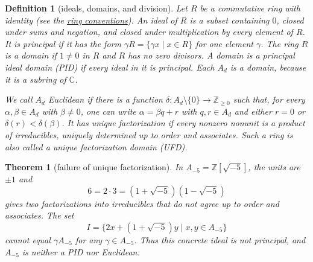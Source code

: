 \documentclass[11pt]{article}
\theoremstyle{ntstyle}
\newtheorem{theorem}{Theorem}[subsection]
\newtheorem{definition}{Definition}[subsection]
\begin{document}
\begin{definition}[ideals, domains, and division]\label{def:8.7.2}\label{def:ideals-domains-and-division}
  Let $R$ be a commutative ring with identity
  (see the \hyperref[def:rings]{ring conventions}). An ideal of $R$ is a subset containing
  $0$, closed under sums and negation, and closed under multiplication
  by every element of $R$. It is principal if it has the form
  $\gamma R=\{\gamma x\mid x\in R\}$ for one element $\gamma$.
  The ring $R$ is a domain if $1\neq0$ in $R$ and $R$ has no zero
  divisors. A domain is a principal ideal domain (PID) if every ideal
  in it is principal. Each $A_d$ is a domain, because it is a subring
  of $\mathbb{C}$.

  We call $A_d$ Euclidean if there is a function
  $\delta:A_d\setminus\{0\}\to\mathbb{Z}_{\ge0}$ such that, for
  every $\alpha,\beta\in A_d$ with $\beta\neq0$, one can write
  $\alpha=\beta q+r$ with $q,r\in A_d$ and either $r=0$ or
  $\delta(r)<\delta(\beta)$.
  It has unique factorization if every nonzero nonunit is a product
  of irreducibles, uniquely determined up to order and associates. Such a ring
  is also called a unique factorization domain (UFD).

\end{definition}

\begin{theorem}[failure of unique factorization]\label{thm:8.7.2}\label{thm:failure-of-unique-factorization}
  In $A_{-5}=\mathbb{Z}[\sqrt{-5}]$, the units are $\pm1$ and
  \[
    6=2\cdot3=(1+\sqrt{-5})(1-\sqrt{-5})
  \]
  gives two factorizations into irreducibles that do not agree up to
  order and associates. The set
  \[
    I=\{2x+(1+\sqrt{-5})y\mid x,y\in A_{-5}\}
  \]
  cannot equal $\gamma A_{-5}$ for any $\gamma\in A_{-5}$.
  Thus this concrete ideal is not principal, and $A_{-5}$ is neither
  a PID nor Euclidean.

\end{theorem}
\end{document}
